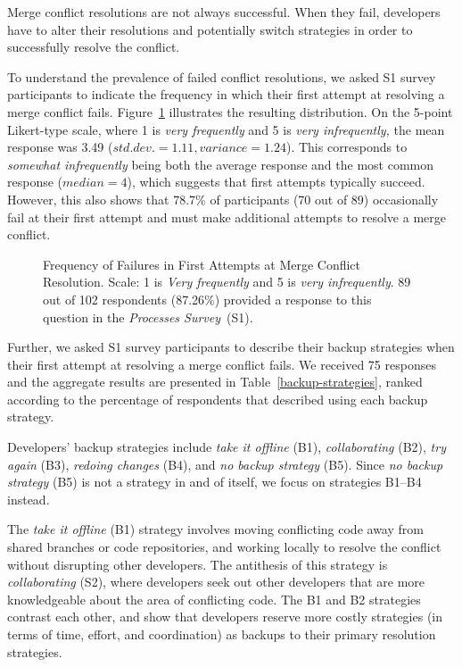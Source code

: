 
Merge conflict resolutions are not always successful.
When they fail, developers have to alter their resolutions and potentially switch strategies in order to successfully resolve the conflict.

To understand the prevalence of failed conflict resolutions, we asked S1 survey participants to indicate the frequency in which their first attempt at resolving a merge conflict fails.
Figure~\ref{fig:first-attempt-failure} illustrates the resulting distribution.
On the 5-point Likert-type scale, where 1 is \textit{very frequently} and 5 is \textit{very infrequently,} the mean response was 3.49 ($std. dev.=1.11, variance=1.24$).
This corresponds to \textit{somewhat infrequently} being both the average response and the most common response ($median=4$), which suggests that first attempts typically succeed.
However, this also shows that 78.7\% of participants (70 out of 89) occasionally fail at their first attempt and must make additional attempts to resolve a merge conflict.

\begin{figure}
	\centering
	\caption{Frequency of Failures in First Attempts at Merge Conflict Resolution. Scale: 1 is \textit{Very frequently} and 5 is \textit{very infrequently}. 89 out of 102 respondents (87.26\%) provided a response to this question in the \textit{Processes Survey}~(S1).\vspace*{-0.3\baselineskip}}
	\label{fig:first-attempt-failure}
\end{figure}

Further, we asked S1 survey participants to describe their backup strategies when their first attempt at resolving a merge conflict fails.
We received 75 responses and the aggregate results are presented in Table~\ref{backup-strategies}, ranked according to the percentage of respondents that described using each backup strategy.

Developers' backup strategies include \textit{take it offline} (B1), \textit{collaborating} (B2), \textit{try again} (B3), \textit{redoing changes} (B4), and \textit{no backup strategy} (B5).
Since \textit{no backup strategy} (B5) is not a strategy in and of itself, we focus on strategies B1--B4 instead.

The \textit{take it offline} (B1) strategy involves moving conflicting code away from shared branches or code repositories, and working locally to resolve the conflict without disrupting other developers.
The antithesis of this strategy is \textit{collaborating} (S2), where developers seek out other developers that are more knowledgeable about the area of conflicting code.
The B1 and B2 strategies contrast each other, and show that developers reserve more costly strategies (in terms of time, effort, and coordination) as backups to their primary resolution strategies.

